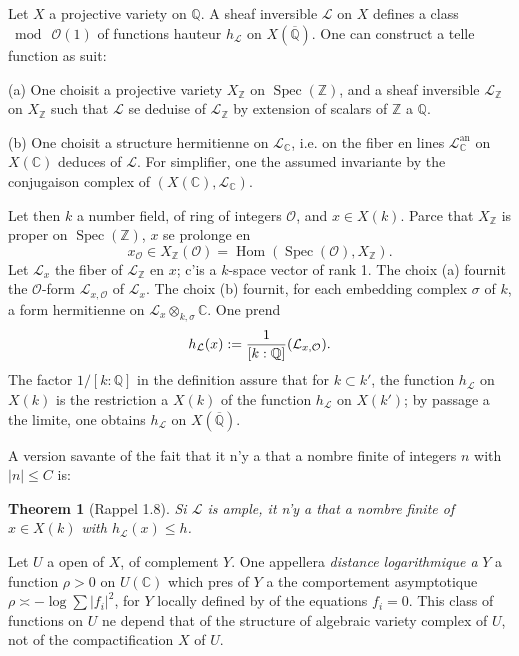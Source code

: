 \documentclass[12pt,a4paper]{article}
\theoremstyle{plain}
\newtheorem{theorem}{Theorem}[section]
\theoremstyle{definition}
\theoremstyle{remark}
\DeclareMathOperator{\Spec}{Spec}
\DeclareMathOperator{\Hom}{Hom}
\newcommand{\CC}{\mathbb{C}}
\newcommand{\QQ}{\mathbb{Q}}
\newcommand{\ZZ}{\mathbb{Z}}
\newcommand{\cO}{\mathcal{O}}
\newcommand{\cL}{\mathcal{L}}
\let\deg\relax
\providecommand{\CC}{\mathbb{C}}
\providecommand{\QQ}{\mathbb{Q}}
\providecommand{\ZZ}{\mathbb{Z}}
\providecommand{\cL}{\mathcal{L}}
\providecommand{\cO}{\mathcal{O}}
\providecommand{\Hom}{\operatorname{Hom}}
\providecommand{\Spec}{\operatorname{Spec}}
\begin{document}
\subsection{}

Let $X$ a projective variety on $\QQ$. A sheaf inversible $\cL$ on $X$ defines a class $\bmod\ \cO(1)$ of functions hauteur $h_{\cL}$ on $X(\overline{\QQ})$. One can construct a telle function as suit:

(a) One choisit a projective variety $X_{\ZZ}$ on $\Spec(\ZZ)$, and a sheaf inversible $\cL_{\ZZ}$ on $X_{\ZZ}$ such that $\cL$ se deduise of $\cL_{\ZZ}$ by extension of scalars of $\ZZ$ a $\QQ$.

(b) One choisit a structure hermitienne on $\cL_\CC$, i.e. on the fiber en lines $\cL_\CC^{\text{an}}$ on $X(\CC)$ deduces of $\cL$. For simplifier, one the assumed invariante by the conjugaison complex of $(X(\CC), \cL_\CC)$.

Let then $k$ a number field, of ring of integers $\cO$, and $x \in X(k)$. Parce that $X_{\ZZ}$ is proper on $\Spec(\ZZ)$, $x$ se prolonge en
\[
x_\cO \in X_{\ZZ}(\cO) = \Hom(\Spec(\cO), X_{\ZZ}).
\]
Let $\cL_x$ the fiber of $\cL_{\ZZ}$ en $x$; c'is a $k$-space vector of rank 1. The choix (a) fournit the $\cO$-form $\cL_{x,\cO}$ of $\cL_x$. The choix (b) fournit, for each embedding complex $\sigma$ of $k$, a form hermitienne on $\cL_x \otimes_{k,\sigma} \CC$. One prend
\[
h_{\cL}(x) := \frac{1}{[k:\QQ]} \deg(\cL_{x,\cO}).
\]
The factor $1/[k:\QQ]$ in the definition assure that for $k \subset k'$, the function $h_{\cL}$ on $X(k)$ is the restriction a $X(k)$ of the function $h_{\cL}$ on $X(k')$; by passage a the limite, one obtains $h_{\cL}$ on $X(\overline{\QQ})$.

A version savante of the fait that it n'y a that a nombre finite of integers $n$ with $|n| \leq C$ is:

\begin{theorem}[Rappel 1.8]
Si $\cL$ is ample, it n'y a that a nombre finite of $x \in X(k)$ with $h_{\cL}(x) \leq h$.
\end{theorem}

Let $U$ a open of $X$, of complement $Y$. One appellera \emph{distance logarithmique a} $Y$ a function $\rho > 0$ on $U(\CC)$ which pres of $Y$ a the comportement asymptotique $\rho \asymp -\log \sum |f_i|^2$, for $Y$ locally defined by of the equations $f_i = 0$. This class of functions on $U$ ne depend that of the structure of algebraic variety complex of $U$, not of the compactification $X$ of $U$.
\end{document}
